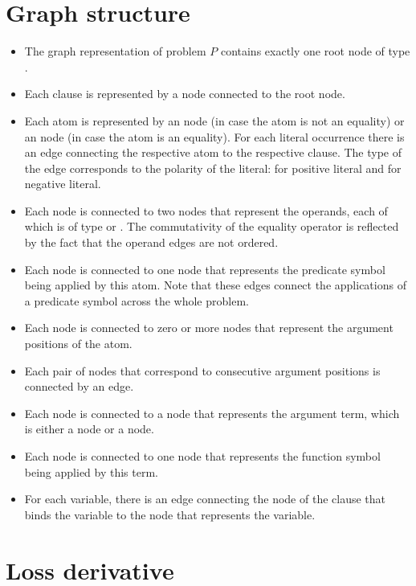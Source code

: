 \documentclass[runningheads]{llncs}
\begin{document}
\section{Graph structure}

\begin{itemize}
\item The graph representation of problem $P$ contains exactly one root node of type .
\item Each clause is represented by a  node connected to the root  node.
\item Each atom is represented by an  node (in case the atom is not an equality)
or an  node (in case the atom is an equality).
For each literal occurrence there is an edge connecting the respective atom to the respective clause.
The type of the edge corresponds to the polarity of the literal:
\epos{} for positive literal and \eneg{} for negative literal.
\item Each  node is connected to two nodes that represent the operands,
each of which is of type  or .
The commutativity of the equality operator is reflected by the fact that the operand edges are not ordered.
\item Each  node is connected to one  node that represents the predicate symbol being applied by this atom.
Note that these edges connect the applications of a predicate symbol across the whole problem.
\item Each  node is connected to zero or more  nodes that represent the argument positions of the atom.
\item Each pair of  nodes that correspond to consecutive argument positions is connected by an edge.
\item Each  node is connected to a node that represents the argument term,
which is either a  node or a  node.
\item Each  node is connected to one  node that represents the function symbol being applied by this term.
\item For each variable, there is an edge connecting the  node of the clause that binds the variable to the  node that represents the variable.
\end{itemize}

\section{Loss derivative}
\end{document}
